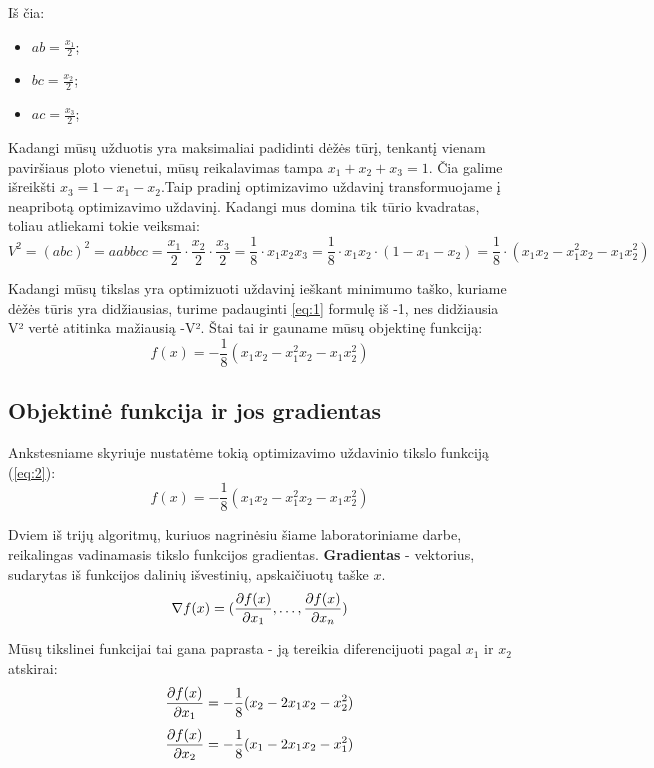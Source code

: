 \documentclass{article}
\begin{document}
Iš čia:
\begin{itemize}
    \item $ab = \frac{x_{1}}{2}$;
    \item $bc = \frac{x_{2}}{2}$;
    \item $ac = \frac{x_{3}}{2}$;
\end{itemize}

Kadangi mūsų užduotis yra maksimaliai padidinti dėžės tūrį, tenkantį vienam paviršiaus ploto vienetui, mūsų reikalavimas tampa $x_{1} + x_{2} + x_{3} = 1$. Čia galime išreikšti $x_{3} = 1 - x_{1} - x_{2}$.Taip pradinį optimizavimo uždavinį transformuojame į neapribotą optimizavimo uždavinį. Kadangi mus domina tik tūrio kvadratas, toliau atliekami tokie veiksmai:
\begin{equation}\label{eq:1}
    V^2 = (abc)^2 = aabbcc = \frac{x_{1}}{2}\cdot \frac{x_{2}}{2}\cdot \frac{x_{3}}{2} = \frac{1}{8}\cdot x_{1}x_{2}x_{3} = \frac{1}{8}\cdot x_{1}x_{2}\cdot (1-x_{1}-x_{2}) = \frac{1}{8}\cdot (x_{1}x_{2}-x_{1}^2x_{2}-x_{1}x_{2}^2)
\end{equation}

Kadangi mūsų tikslas yra optimizuoti uždavinį ieškant minimumo taško, kuriame dėžės tūris yra didžiausias, turime padauginti \ref{eq:1} formulę iš -1, nes didžiausia V² vertė atitinka mažiausią -V². Štai tai ir gauname mūsų objektinę funkciją:
\begin{equation}\label{eq:2}
    f(x) = -\frac{1}{8}(x_{1}x_{2}-x_{1}^2x_{2}-x_{1}x_{2}^2)
\end{equation}
\subsection{Objektinė funkcija ir jos gradientas}
Ankstesniame skyriuje nustatėme tokią optimizavimo uždavinio tikslo funkciją (\ref{eq:2}):
\begin{equation*}
    f(x) = -\frac{1}{8}(x_{1}x_{2}-x_{1}^2x_{2}-x_{1}x_{2}^2)
\end{equation*}

Dviem iš trijų algoritmų, kuriuos nagrinėsiu šiame laboratoriniame darbe, reikalingas vadinamasis tikslo funkcijos gradientas. \textbf{Gradientas} - vektorius, sudarytas iš funkcijos dalinių išvestinių,
apskaičiuotų taške $x$.
\begin{equation*}
    \nabla f(x) = (\pdv{f(x)}{x_{1}},\dots,\pdv{f(x)}{x_{n}})
\end{equation*}

Mūsų tikslinei funkcijai tai gana paprasta - ją tereikia diferencijuoti pagal $x_{1}$ ir $x_{2}$ atskirai:
\begin{equation*}
    \pdv{f(x)}{x_{1}} = -\frac{1}{8}(x_{2}-2x_{1}x_{2}-x_{2}^2)
\end{equation*}
\begin{equation*}
    \pdv{f(x)}{x_{2}} = -\frac{1}{8}(x_{1}-2x_{1}x_{2}-x_{1}^2)
\end{equation*}
\end{document}
